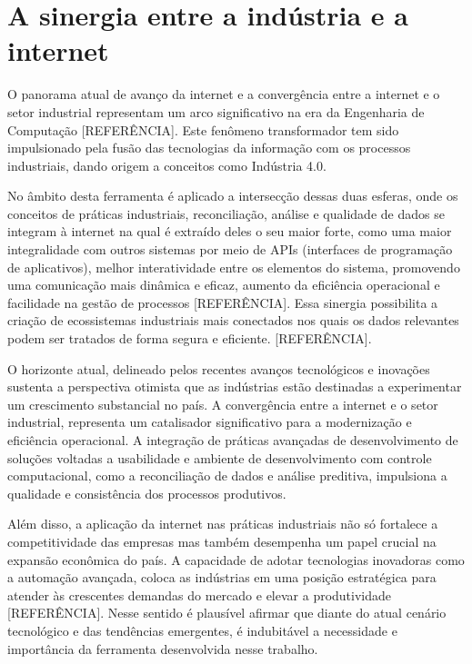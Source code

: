 \section{A sinergia entre a indústria e a internet}

O panorama atual de avanço da internet e a convergência entre a internet e o setor industrial representam um arco significativo na era da Engenharia de Computação [REFERÊNCIA]. Este fenômeno transformador tem sido impulsionado pela fusão das tecnologias da informação com os processos industriais, dando origem a conceitos como Indústria 4.0. 

No âmbito desta ferramenta é aplicado a intersecção dessas duas esferas, onde os conceitos de práticas industriais, reconciliação, análise e qualidade de dados se integram à internet na qual é extraído deles o seu maior forte, como uma maior integralidade com outros sistemas por meio de APIs (interfaces de programação de aplicativos), melhor interatividade entre os elementos do sistema, promovendo uma comunicação mais dinâmica e eficaz, aumento da eficiência operacional e facilidade na gestão de processos [REFERÊNCIA]. Essa sinergia possibilita a criação de ecossistemas industriais mais conectados nos quais os dados relevantes podem ser tratados de forma segura e eficiente. [REFERÊNCIA].

O horizonte atual, delineado pelos recentes avanços tecnológicos e inovações sustenta a perspectiva otimista que as indústrias estão destinadas a experimentar um crescimento substancial no país. A convergência entre a internet e o setor industrial, representa um catalisador significativo para a modernização e eficiência operacional. A integração de práticas avançadas de desenvolvimento de soluções voltadas a usabilidade e ambiente de desenvolvimento com controle computacional, como a reconciliação de dados e análise preditiva, impulsiona a qualidade e consistência dos processos produtivos.

Além disso, a aplicação da internet nas práticas industriais não só fortalece a competitividade das empresas mas também desempenha um papel crucial na expansão econômica do país. A capacidade de adotar tecnologias inovadoras como a automação avançada, coloca as indústrias em uma posição estratégica para atender às crescentes demandas do mercado e elevar a produtividade [REFERÊNCIA]. Nesse sentido é plausível afirmar que diante do atual cenário tecnológico e das tendências emergentes, é indubitável a necessidade e importância da ferramenta desenvolvida nesse trabalho.